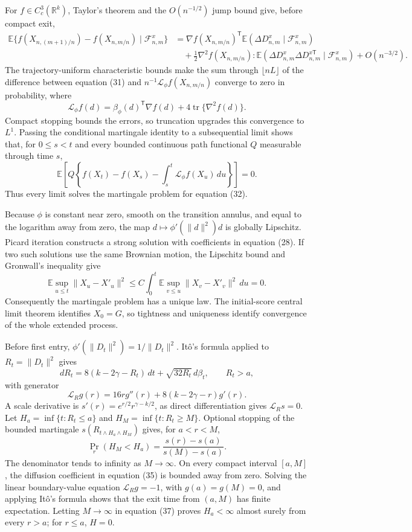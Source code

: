 For \(f\in C_c^3(\mathbb R^k)\), Taylor's theorem and the \(O(n^{-1/2})\) jump bound give, before compact exit,
\[
 \begin{split}
 \mathbb E\{f(X_{n,(m+1)/n})-f(X_{n,m/n})\mid\mathcal F^x_{n,m}\}
 &=\nabla f(X_{n,m/n})^{\mathsf T}
   \mathbb E(\Delta D^x_{n,m}\mid\mathcal F^x_{n,m})\\
 &\quad+\frac12\nabla^2f(X_{n,m/n}):
 \mathbb E(\Delta D^x_{n,m}\Delta D^{x\mathsf T}_{n,m}
 \mid\mathcal F^x_{n,m})+O(n^{-3/2}). \tag{31}
 \end{split}
\]
The trajectory-uniform characteristic bounds make the sum through \(\lfloor nL\rfloor\) of the difference between equation (31) and
\(n^{-1}\mathcal L_\phi f(X_{n,m/n})\) converge to zero in probability, where
\[
 \mathcal L_\phi f(d)
 =\beta_\phi(d)^{\mathsf T}\nabla f(d)
  +4\operatorname{tr}\{\nabla^2f(d)\}. \tag{32}
\]
Compact stopping bounds the errors, so truncation upgrades this convergence to \(L^1\). Passing the conditional martingale identity to a subsequential limit shows that, for \(0\le s<t\) and every bounded continuous path functional \(Q\) measurable through time \(s\),
\[
 \mathbb E\!\left[
 Q\left\{f(X_t)-f(X_s)-\int_s^t\mathcal L_\phi f(X_u)\,du\right\}
 \right]=0. \tag{33}
\]
Thus every limit solves the martingale problem for equation (32).

Because \(\phi\) is constant near zero, smooth on the transition annulus, and equal to the logarithm away from zero, the map
\(d\mapsto\phi'(\|d\|^2)d\) is globally Lipschitz. Picard iteration constructs a strong solution with coefficients in equation (28). If two such solutions use the same Brownian motion, the Lipschitz bound and Gronwall's inequality give
\[
 \mathbb E\sup_{u\le t}\|X_u-X'_u\|^2
 \le C\int_0^t\mathbb E\sup_{v\le u}\|X_v-X'_v\|^2\,du=0. \tag{34}
\]
Consequently the martingale problem has a unique law. The initial-score central limit theorem identifies \(X_0=G\), so tightness and uniqueness identify convergence of the whole extended process.

Before first entry, \(\phi'(\|D_t\|^2)=1/\|D_t\|^2\). It\^o's formula applied to \(R_t=\|D_t\|^2\) gives
\[
 dR_t=8(k-2\gamma-R_t)\,dt+\sqrt{32R_t}\,d\beta_t,
 \qquad R_t>a, \tag{35}
\]
with generator
\[
 \mathcal L_Rg(r)=16r g''(r)+8(k-2\gamma-r)g'(r). \tag{36}
\]
A scale derivative is \(s'(r)=e^{r/2}r^{\gamma-k/2}\), as direct differentiation gives \(\mathcal L_Rs=0\). Let
\(H_a=\inf\{t:R_t\le a\}\) and \(H_M=\inf\{t:R_t\ge M\}\). Optional stopping of the bounded martingale
\(s(R_{t\wedge H_a\wedge H_M})\) gives, for \(a<r<M\),
\[
 \Pr_r(H_M<H_a)=\frac{s(r)-s(a)}{s(M)-s(a)}. \tag{37}
\]
The denominator tends to infinity as \(M\to\infty\). On every compact interval \([a,M]\), the diffusion coefficient in equation (35) is bounded away from zero. Solving the linear boundary-value equation
\(\mathcal L_Rg=-1\), with \(g(a)=g(M)=0\), and applying It\^o's formula shows that the exit time from \((a,M)\) has finite expectation. Letting \(M\to\infty\) in equation (37) proves \(H_a<\infty\) almost surely from every \(r>a\); for \(r\le a\), \(H=0\).

